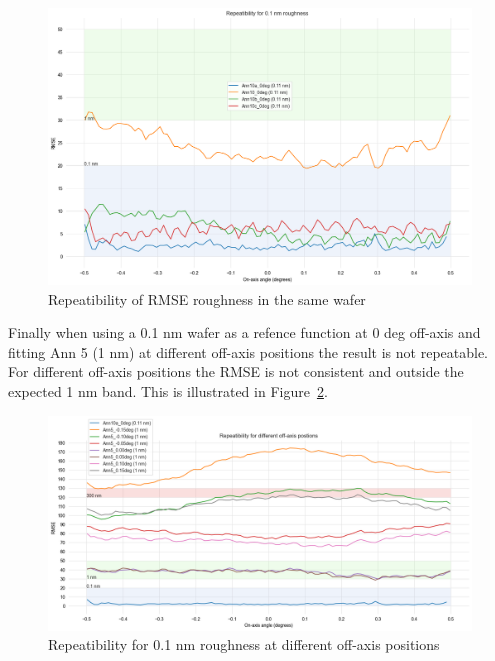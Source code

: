 \documentclass[
  letterpaper,
  DIV=11,
  numbers=noendperiod,
  oneside]{scrreprt}
\begin{document}
\begin{figure}

{\centering \includegraphics{notebooks/d_RMSE_files/figure-pdf/fig-5-6-output-1.png}

}

\caption{\label{fig-5-6}Repeatibility of RMSE roughness in the same
wafer}

\end{figure}

Finally when using a 0.1 nm wafer as a refence function at 0 deg
off-axis and fitting Ann 5 (1 nm) at different off-axis positions the
result is not repeatable. For different off-axis positions the RMSE is
not consistent and outside the expected 1 nm band. This is illustrated
in Figure~\ref{fig-5-7}.

\begin{figure}

{\centering \includegraphics{notebooks/d_RMSE_files/figure-pdf/fig-5-7-output-1.png}

}

\caption{\label{fig-5-7}Repeatibility for 0.1 nm roughness at different
off-axis positions}

\end{figure}
\end{document}
